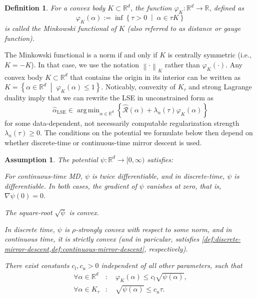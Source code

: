 \documentclass[a4paper]{article}
\makeatletter
\newcommand{\myitem}[1]{
\item[#1]\protected@edef\@currentlabel{#1}
}
\newcommand{\mathset}[1]{\left\{#1\right\}}
\newcommand{\norm}[1]{\left\|#1\right\|}
\newcommand{\setmid}[0]{\;\middle|\;}
\newcommand{\RR}[0]{\mathbb{R}}
\newcommand{\cR}[0]{\mathcal{R}}
\newcommand{\ha}[0]{\widehat{\alpha}}
\DeclareMathOperator{\LSEOp}{LSE}
\newcommand{\haLSE}[0]{\ha_{{\LSEOp}}}
\newcommand{\Kt}[0]{K_\tau}
\DeclareMathOperator*{\argmin}{arg\,min}
\newcommand{\Rhat}[0]{\widehat{\cR}}
\theoremstyle{thmstyle}
\theoremstyle{defstyle}
\newtheorem{assumption}{Assumption}
\newtheorem{definition}{Definition}
\theoremstyle{remark}
\makeatother
\begin{document}
\begin{definition}
\label{def:Minkowski-functional}
For a convex body $K\subset\RR^d$, the function $\varphi_K:\RR^d\to\RR$, defined as
\begin{equation*}
    \varphi_K(\alpha):=\inf\mathset{\tau>0\setmid \alpha\in \tau K}
\end{equation*}
is called the \emph{Minkowski functional} of $K$ (also referred to as distance or gauge function).
\end{definition}
The Minkowski functional is a norm if and only if $K$ is centrally symmetric (i.e., $K = -K$). In that case, we use the notation $\norm{\cdot}_{K}$ rather than $  \varphi_K(\cdot)$.
Any convex body $K\subset \RR^d$ that contains the origin in its interior 
can be written as $K=\mathset{\alpha\in\RR^d\setmid \varphi_K(\alpha)\leq 1}$.
Noticably, convexity of $\Kt$ and strong Lagrange duality imply that we can rewrite the LSE in unconstrained form as 
\[
\haLSE \in \argmin_{\alpha\in\RR^d} \mathset{\Rhat(\alpha) + \lambda_n(\tau)\varphi_K(\alpha) }
\]
for some data-dependent, not necessarily computable regularization strength $\lambda_n(\tau) \geq 0$.
The conditions on the potential we formulate below then depend on whether discrete-time or continuous-time mirror descent is used.
\begin{assumption}
\label{ass:sufficient-conditions-psi}
    The potential $\psi:\RR^d \to [0,\infty)$ satisfies:
    \begin{defenum}[leftmargin=*,itemsep=0pt,topsep=2pt]
        \myitem{(I)} \label{ass:suff-1} For continuous-time MD, $\psi$ is twice differentiable, and in discrete-time, $\psi$ is differentiable.
        In both cases, the gradient of $\psi$ vanishes at zero, that is, $\nabla \psi(0)=0$.
        \myitem{(II)} \label{ass:suff-2} The square-root $\sqrt{\psi}$ is convex.
        \myitem{(III)} \label{ass:suff-3} In discrete time, $\psi$ is $\rho$-strongly convex with respect to some norm, and in continuous time, it is strictly convex (and in paricular, satisfies \cref{def:discrete-mirror-descent,def:continuous-mirror-descent}, respectively).
        \myitem{(IV)} \label{ass:suff-4}There exist constants $c_l,c_u>0$ independent of all other parameters, such that
        \begin{align*}
        \forall \alpha\in\RR^d&:\quad  \varphi_K(\alpha)\leq c_l \sqrt{\psi(\alpha)}, \\ 
        \forall \alpha\in \Kt&:\quad  \sqrt{\psi(\alpha)}\leq c_u \tau.
    \end{align*}
    \end{defenum}
\end{assumption}
\end{document}
